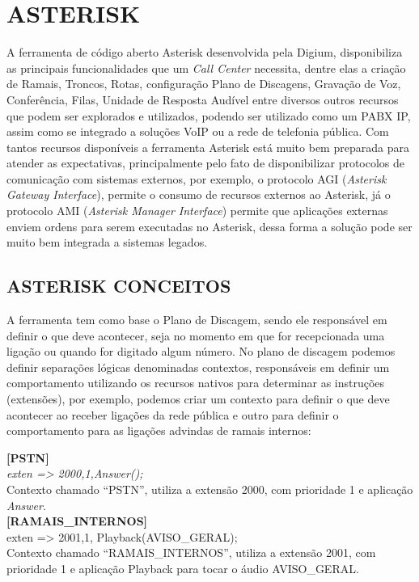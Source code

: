 \section{ASTERISK}
A ferramenta de código aberto Asterisk desenvolvida pela Digium, disponibiliza as principais funcionalidades que um \textit{Call Center} necessita, dentre elas a criação de Ramais, Troncos, Rotas, configuração Plano de Discagens, Gravação de Voz, Conferência, Filas, Unidade de Resposta Audível entre diversos outros recursos que podem ser explorados e utilizados, podendo ser utilizado como um PABX IP, assim como se integrado a soluções VoIP ou a rede de telefonia pública.
Com tantos recursos disponíveis a ferramenta Asterisk está muito bem preparada para atender as expectativas, principalmente pelo fato de disponibilizar protocolos de comunicação com sistemas externos, por exemplo, o protocolo AGI (\textit{Asterisk Gateway Interface}), permite o consumo de recursos externos ao Asterisk, já o protocolo AMI (\textit{Asterisk Manager Interface}) permite que aplicações externas enviem ordens para serem executadas no Asterisk, dessa forma a solução pode ser muito bem integrada a sistemas legados.


\subsection{\textbf{ASTERISK CONCEITOS}}

A ferramenta tem como base o Plano de Discagem, sendo ele responsável em definir o que deve acontecer, seja no momento em que for recepcionada uma ligação ou quando for digitado algum número. No plano de discagem podemos definir separações lógicas denominadas contextos\label{key:contexto}, responsáveis em definir um comportamento utilizando os recursos nativos para determinar as instruções (extensões), por exemplo, podemos criar um contexto para definir o que deve acontecer ao receber ligações da rede pública e outro para definir o comportamento para as ligações advindas de ramais internos:

\begin{flushleft}

\textbf{[PSTN]} \\
\textit{exten => 2000,1,Answer();} \\
Contexto chamado “PSTN”, utiliza a extensão 2000, com prioridade 1 e aplicação \textit{Answer}.\\

\textbf{[RAMAIS\_INTERNOS]} \\
exten => 2001,1, Playback(AVISO\_GERAL); \\
Contexto chamado “RAMAIS\_INTERNOS”, utiliza a extensão 2001, com prioridade 1 e aplicação Playback para tocar o áudio AVISO\_GERAL.\\
\end{flushleft}

